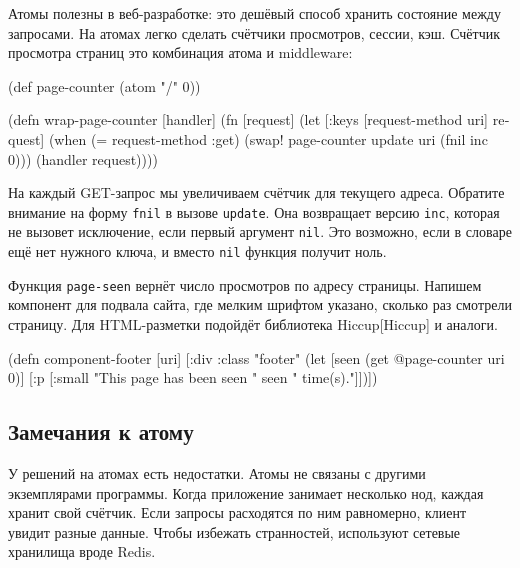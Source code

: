 
Атомы полезны в веб-разработке: это дешёвый способ хранить состояние между
запросами. На атомах легко сделать счётчики просмотров, сессии, кэш. Счётчик
просмотра страниц это комбинация атома и middleware:

\begin{english}
  \begin{clojure}
(def page-counter
  (atom {"/" 0}))

(defn wrap-page-counter
  [handler]
  (fn [request]
    (let [{:keys [request-method uri]} request]
      (when (= request-method :get)
        (swap! page-counter update uri (fnil inc 0)))
      (handler request))))
  \end{clojure}
\end{english}


На каждый GET-запрос мы увеличиваем счётчик для текущего адреса. Обратите
внимание на форму \verb|fnil| в вызове \verb|update|. Она возвращает версию
\verb|inc|, которая не вызовет исключение, если первый аргумент
\verb|nil|. Это возможно, если в словаре ещё нет нужного ключа, и вместо
\verb|nil| функция получит ноль.


Функция \verb|page-seen| вернёт число просмотров по адресу страницы. Напишем
компонент для подвала сайта, где мелким шрифтом указано, сколько раз смотрели
страницу. Для HTML-разметки подойдёт библиотека
Hiccup[Hiccup] и аналоги.

\begin{english}
  \begin{clojure}
(defn component-footer [uri]
  [:div {:class "footer"}
   (let [seen (get @page-counter uri 0)]
     [:p [:small "This page has been seen " seen " time(s)."]])])
  \end{clojure}
\end{english}

\subsection{Замечания к атому}

У решений на атомах есть недостатки. Атомы не связаны с другими экземплярами
программы. Когда приложение занимает несколько нод, каждая хранит свой
счётчик. Если запросы расходятся по ним равномерно, клиент увидит разные
данные. Чтобы избежать странностей, используют сетевые хранилища вроде Redis.

